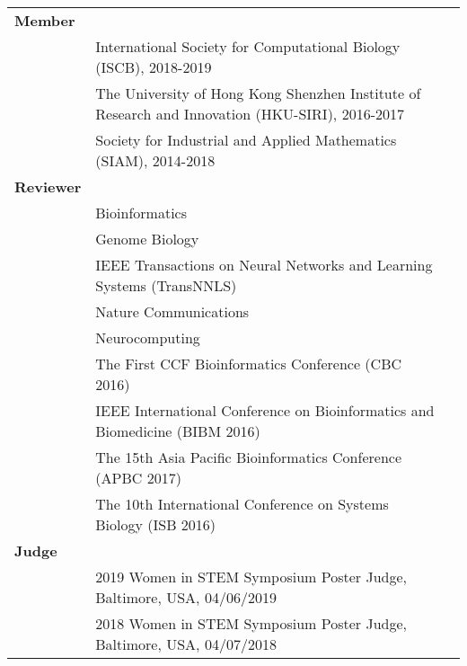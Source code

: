 \begin{longtable}{Xlr}
{\bf Member} & &\\
& International Society for Computational Biology (ISCB), 2018-2019 &\\
& The University of Hong Kong Shenzhen Institute of Research and Innovation (HKU-SIRI), 2016-2017&\\
 & Society for Industrial and Applied Mathematics (SIAM), 2014-2018 &\\
 {\bf Reviewer} &&\\
  & Bioinformatics &\\
&Genome Biology&\\
& IEEE Transactions on Neural Networks and Learning Systems (TransNNLS)&\\
& Nature Communications&\\
& Neurocomputing &\\
& The First CCF Bioinformatics Conference (CBC 2016)&\\
&IEEE International Conference on Bioinformatics and Biomedicine (BIBM 2016)&\\
&The 15th Asia Pacific Bioinformatics Conference (APBC 2017)&\\
& The 10th International Conference on Systems Biology (ISB 2016)&\\
{\bf Judge} & &\\
& 2019 Women in STEM Symposium Poster Judge, Baltimore, USA, 04/06/2019\\
&2018 Women in STEM Symposium Poster Judge, Baltimore, USA, 04/07/2018\\
\end{longtable}
